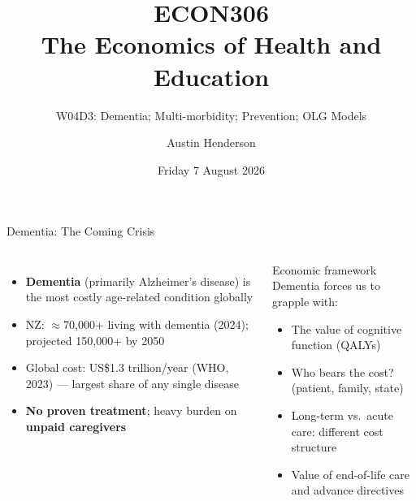 \documentclass[aspectratio=169, 12pt]{beamer}
\title[ECON306: W04D3 — Dementia, Prevention, OLG Models]{ECON306\\The Economics of Health and Education}
\subtitle{W04D3: Dementia; Multi-morbidity; Prevention; OLG Models}
\author{Austin Henderson}
\institute{Department of Economics\\University of Otago}
\date{Friday 7 August 2026}
\begin{document}
\begin{frame}[plain]
  \titlepage
\end{frame}



\begin{frame}{Dementia: The Coming Crisis}
  \begin{columns}
      \small
      \begin{itemize}
        \item \textbf{Dementia} (primarily Alzheimer's disease) is the most costly age-related
              condition globally
        \item NZ: $\approx$70,000+ living with dementia (2024); projected 150,000+ by 2050
        \item Global cost: US\$1.3 trillion/year (WHO, 2023) --- largest share of any
              single disease
        \item \textbf{No proven treatment}; heavy burden on \textbf{unpaid caregivers}
      \end{itemize}
      \begin{alertblock}{Economic framework}
        \footnotesize Dementia forces us to grapple with:
        \begin{itemize}
          \item The value of cognitive function (QALYs)
          \item Who bears the cost? (patient, family, state)
          \item Long-term vs.\ acute care: different cost structure
          \item Value of end-of-life care and advance directives
        \end{itemize}
      \end{alertblock}
  \end{columns}
\end{frame}
\end{document}
